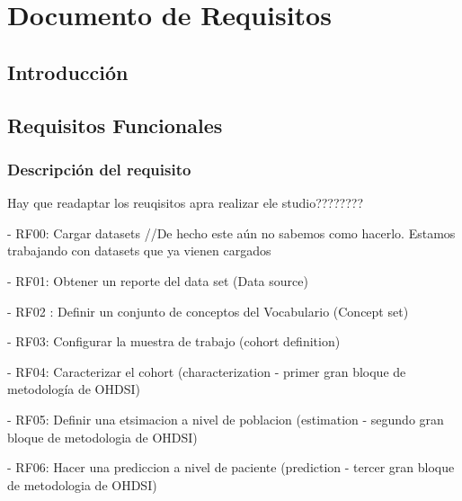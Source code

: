 \chapter{Documento de Requisitos}\label{cap:06requisitos}

\section{Introducción}






\section{Requisitos Funcionales}

\subsection{Descripción del requisito}

Hay que readaptar los reuqisitos apra realizar ele studio????????

- RF00: Cargar datasets //De hecho este aún no sabemos como hacerlo. Estamos trabajando con datasets que ya vienen cargados

- RF01: Obtener un reporte del data set (Data source)

- RF02 : Definir un conjunto de conceptos del Vocabulario (Concept set)

- RF03: Configurar la muestra de trabajo (cohort definition)

- RF04: Caracterizar el cohort (characterization - primer gran bloque de metodología de OHDSI)

- RF05: Definir una etsimacion a nivel de poblacion (estimation - segundo gran bloque de metodologia de OHDSI)

- RF06: Hacer una prediccion a nivel de paciente (prediction - tercer gran bloque de metodologia de OHDSI)





